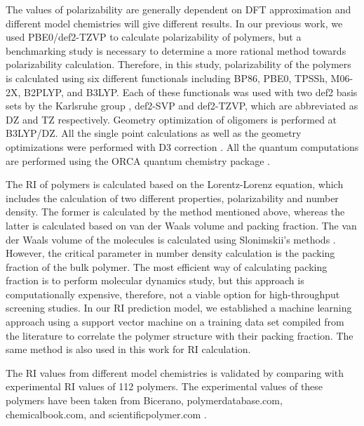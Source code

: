 
The values of polarizability are generally dependent on DFT approximation and different model chemistries will give different results. In our previous work, we used PBE0/def2-TZVP to calculate polarizability of polymers, but a benchmarking study is necessary to determine a more rational method towards polarizability calculation. Therefore, in this study, polarizability of the polymers is calculated using six different functionals including BP86, PBE0, TPSSh, M06-2X, B2PLYP, and B3LYP. Each of these functionals was used with two def2 basis sets by the Karlsruhe group \cite{Weigend2005}, def2-SVP and def2-TZVP, which are abbreviated as DZ and TZ respectively. Geometry optimization of oligomers is performed at B3LYP/DZ. All the single point calculations as well as the geometry optimizations were performed with D3 correction \cite{Grimme2010}. All the quantum computations are performed using the ORCA quantum chemistry package \cite{Neese2012}.

The RI of polymers is calculated based on the Lorentz-Lorenz equation, which includes the calculation of two different properties, polarizability and number density. The former is calculated by the method mentioned above, whereas the latter is calculated based on van der Waals volume and packing fraction. The van der Waals volume of the molecules is calculated using Slonimskii's methods \cite{Slonimskii1970}. However, the critical parameter in number density calculation is the packing fraction of the bulk polymer. The most efficient way of calculating packing fraction is to perform molecular dynamics study, but this approach is computationally expensive, therefore, not a viable option for high-throughput screening studies. In our RI prediction model, we established a machine learning approach using a support vector machine on a training data set compiled from the literature to correlate the polymer structure with their packing fraction. The same method is also used in this work for RI calculation.

The RI values from different model chemistries is validated by comparing with experimental RI values of 112 polymers. The experimental values of these polymers have been taken from Bicerano, polymerdatabase.com, chemicalbook.com, and scientificpolymer.com \cite{Bicerano2002}. 

